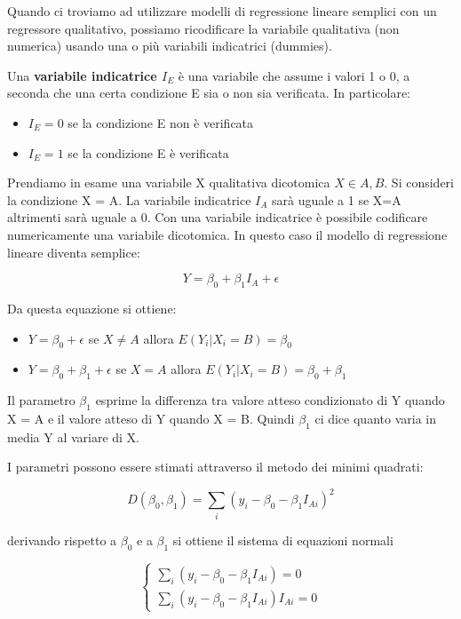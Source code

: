 \documentclass[a4paper]{extarticle}
\begin{document}
Quando ci troviamo ad utilizzare modelli di regressione lineare semplici con un regressore qualitativo, possiamo ricodificare la variabile qualitativa (non numerica) usando una o più variabili indicatrici (dummies). 

Una \textbf{variabile indicatrice $I_E$} è una variabile che assume i valori 1 o 0, a seconda che una certa condizione E sia o non sia verificata. In particolare:

\begin{itemize}
\item $I_E = 0$ se la condizione E non è verificata
\item $I_E = 1$ se la condizione E è verificata
\end{itemize}

Prendiamo in esame una variabile X qualitativa dicotomica $X \in {A,B}$. Si consideri la condizione X = A. La variabile indicatrice $I_A$ sarà uguale a 1 se X=A altrimenti sarà uguale a 0. Con una variabile indicatrice è possibile codificare numericamente una variabile dicotomica. In questo caso il modello di regressione lineare diventa semplice:

\begin{equation*}
Y = \beta_0 + \beta_1 I_A +\epsilon
\end{equation*}

Da questa equazione si ottiene:

\begin{itemize}
\item $ Y = \beta_0 + \epsilon$ se $X \not = A$ allora $E(Y_i|X_i = B) = \beta_0$
\item $ Y = \beta_0 + \beta_1 + \epsilon$ se $X  = A$ allora $E(Y_i|X_i = B) = \beta_0 + \beta_1$
\end{itemize}

Il parametro $\beta_1$ esprime la differenza tra valore atteso condizionato di Y quando X = A e il valore atteso di Y quando X = B. Quindi $\beta_1$ ci dice quanto varia in media Y al variare di X.

I parametri possono essere stimati attraverso il metodo dei minimi quadrati:

\begin{equation*}
D(\beta_0,\beta_1) = \sum\limits_i(y_i - \beta_0 - \beta_1 I_{Ai})^2
\end{equation*}

derivando rispetto a $\beta_0$ e a $\beta_1$ si ottiene il sistema di equazioni normali

\begin{equation*}
\begin{cases}
		\sum\limits_i(y_i-\beta_0 - \beta_1I_{Ai}) = 0\\
		\sum\limits_i(y_i-\beta_0 - \beta_1I_{Ai})I_{Ai} = 0
	\end{cases}
\end{equation*}
\end{document}
